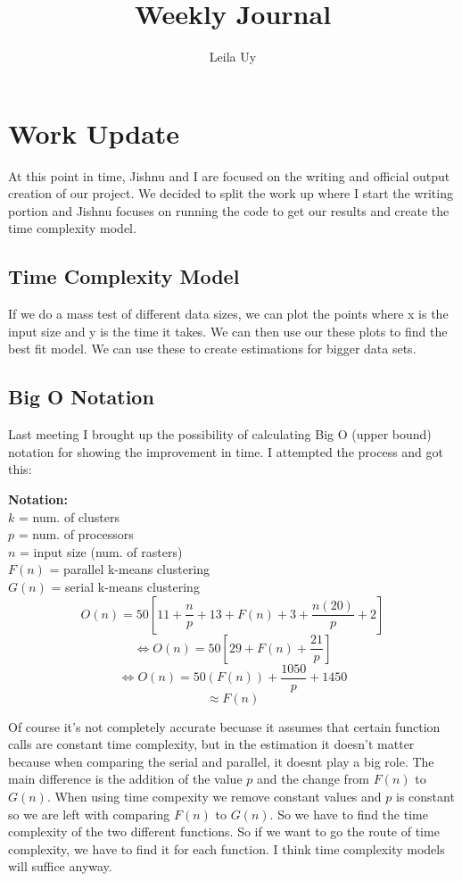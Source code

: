 \documentclass[a4paper,10pt]{article}
\title{Weekly Journal}
\author{Leila Uy}
\begin{document}
\maketitle

% 

\section{Work Update}
At this point in time, Jishnu and I are focused on the writing and official output creation of our project. We decided to split the work up where I start the writing portion and Jishnu focuses on running the code to get our results and create the time complexity model.

\subsection{Time Complexity Model}
If we do a mass test of different data sizes, we can plot the points where x is the input size and y is the time it takes. We can then use our these plots to find the best fit model. We can use these to create estimations for bigger data sets.

\subsection{Big O Notation}
Last meeting I brought up the possibility of calculating Big O (upper bound) notation for showing the improvement in time. I attempted the process and got this:

\textbf{Notation:} \\
$k$ = num. of clusters \\
$p$ = num. of processors \\
$n$ = input size (num. of rasters) \\
$F(n)$ = parallel k-means clustering \\
$G(n)$ = serial k-means clustering \\

\[ O(n) = 50[ 11 + \frac{n}{p} + 13 + F(n) + 3 + \frac{n(20)}{p} + 2] \]
\[ \iff O(n) = 50[29 + F(n) + \frac{21}{p}] \]
\[ \iff O(n) = 50(F(n)) + \frac{1050}{p} + 1450 \]
\[ \approx F(n) \]

Of course it's not completely accurate becuase it assumes that certain function calls are constant time complexity, but in the estimation it doesn't matter because when comparing the serial and parallel, it doesnt play a big role. The main difference is the addition of the value $p$ and the change from $F(n)$ to $G(n)$. When using time compexity we remove constant values and $p$ is constant so we are left with comparing $F(n)$ to $G(n)$. So we have to find the time complexity of the two different functions. So if we want to go the route of time complexity, we have to find it for each function. I think time complexity models will suffice anyway. 
\end{document}
